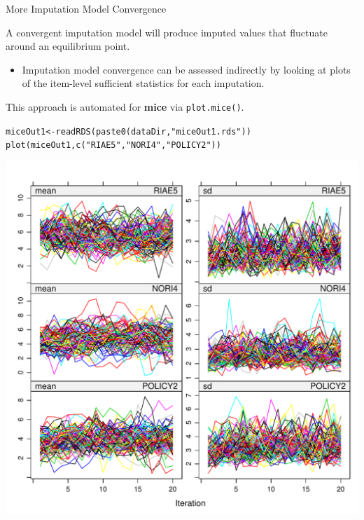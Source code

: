 \documentclass{beamer}\usepackage[]{graphicx}\usepackage[]{color}
\makeatletter
\newcommand{\hlstr}[1]{\textcolor[rgb]{0.749,0.012,0.012}{#1}}%
\newcommand{\hlstd}[1]{\textcolor[rgb]{0,0,0}{#1}}%
\newcommand{\hlkwb}[1]{\textcolor[rgb]{0,0.341,0.682}{#1}}%
\newcommand{\hlkwd}[1]{\textcolor[rgb]{0.004,0.004,0.506}{#1}}%
\newenvironment{kframe}{%
 \def\at@end@of@kframe{}%
 \ifinner\ifhmode%
  \def\at@end@of@kframe{\end{minipage}}%
  \begin{minipage}{\columnwidth}%
 \fi\fi%
 \def\FrameCommand##1{\hskip\@totalleftmargin \hskip-\fboxsep
 \colorbox{shadecolor}{##1}\hskip-\fboxsep
     \hskip-\linewidth \hskip-\@totalleftmargin \hskip\columnwidth}%
 \MakeFramed {\advance\hsize-\width
   \@totalleftmargin\z@ \linewidth\hsize
   \@setminipage}}%
 {\par\unskip\endMakeFramed%
 \at@end@of@kframe}
\newenvironment{knitrout}{}{} %
\makeatother
\begin{document}
\begin{frame}{More Imputation Model Convergence}
  
  A convergent imputation model will produce imputed values that
  fluctuate around an equilibrium point. 
  \vb
  \begin{itemize}
  \item Imputation model convergence can be assessed indirectly by
    looking at plots of the item-level sufficient statistics for each
    imputation.
  \end{itemize}
  \va
  This approach is automated for \textbf{mice} via \texttt{plot.mice()}.
  \va

\begin{knitrout}\footnotesize
{}\color{fgcolor}\begin{kframe}
\begin{alltt}
\hlstd{miceOut1} \hlkwb{<-} \hlkwd{readRDS}\hlstd{(}\hlkwd{paste0}\hlstd{(dataDir,} \hlstr{"miceOut1.rds"}\hlstd{))}
\hlkwd{plot}\hlstd{(miceOut1,} \hlkwd{c}\hlstd{(}\hlstr{"RIAE5"}\hlstd{,} \hlstr{"NORI4"}\hlstd{,} \hlstr{"POLICY2"}\hlstd{))}
\end{alltt}
\end{kframe}

{\centering \includegraphics[width=0.65\linewidth]{figure/unnamed-chunk-5-1} 

}



\end{knitrout}

\end{frame}

\watermarkon %
\end{document}
